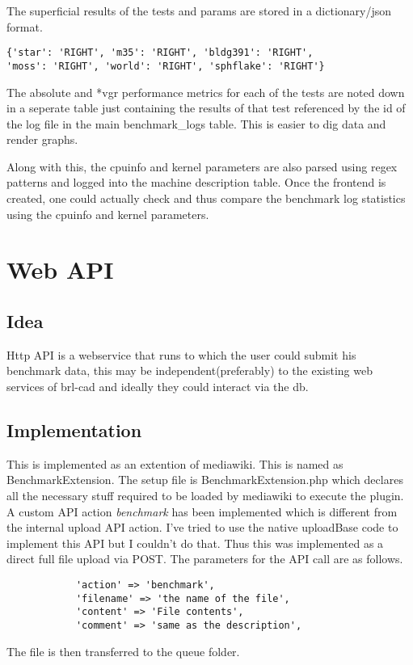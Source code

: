 \documentclass[a4paper,12pt, titlepage]{article}
\begin{document}
The superficial results of the tests and params are stored in a dictionary/json format.

\begin{verbatim}
{'star': 'RIGHT', 'm35': 'RIGHT', 'bldg391': 'RIGHT', 
'moss': 'RIGHT', 'world': 'RIGHT', 'sphflake': 'RIGHT'}
\end{verbatim}

The absolute and *vgr performance metrics for each of the tests are noted down in a seperate table just containing the results of that test referenced by the id of the log file in the main benchmark_logs table. This is easier to dig data and render graphs.

Along with this, the cpuinfo and kernel parameters are also parsed using regex patterns and logged into the machine description table. Once the frontend is created, one could actually check and thus compare the benchmark log statistics using the cpuinfo and kernel parameters.



\section{Web API}
\subsection{Idea}
Http API is a webservice that runs to which the user could submit his benchmark data, this may be independent(preferably) to the existing web services of brl-cad and ideally they could interact via the db. 

\subsection{Implementation}
This is implemented as an extention of mediawiki. This is named as BenchmarkExtension. The setup file is BenchmarkExtension.php which declares all the necessary stuff required to be loaded by mediawiki to execute the plugin. A custom API action \emph{benchmark} has been implemented which is different from the internal upload API action. I've tried to use the native uploadBase code to implement this API but I couldn't do that. Thus this was implemented as a direct full file upload via POST. The parameters for the API call are as follows.
\begin{verbatim}
            'action' => 'benchmark',
            'filename' => 'the name of the file',
            'content' => 'File contents',
            'comment' => 'same as the description',
\end{verbatim}
The file is then transferred to the queue folder.
\end{document}
